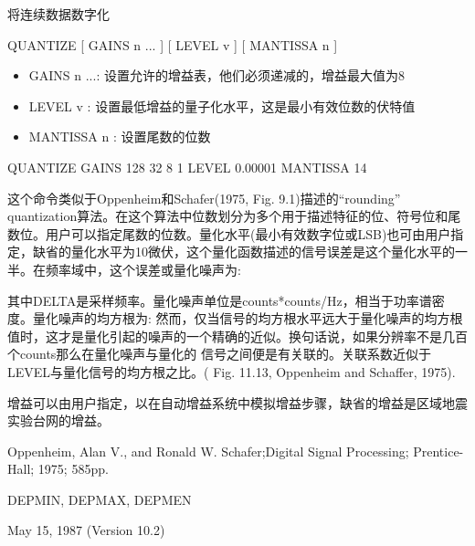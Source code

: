 \label{cmd:quantize}

将连续数据数字化

QUANTIZE [ GAINS n ... ] [ LEVEL v ] [ MANTISSA n ]

\begin{itemize}
\item GAINS n ...: 设置允许的增益表，他们必须递减的，增益最大值为8 
\item LEVEL v :  设置最低增益的量子化水平，这是最小有效位数的伏特值 
\item MANTISSA n : 设置尾数的位数 
\end{itemize}

QUANTIZE GAINS 128 32 8 1 LEVEL 0.00001 MANTISSA 14

这个命令类似于Oppenheim和Schafer(1975, Fig. 9.1)描述的``rounding'' quantization算法。在这个算法中位数划分为多个用于描述特征的位、符号位和尾数位。用户可以指定尾数的位数。量化水平(最小有效数字位或LSB)也可由用户指定，缺省的量化水平为10微伏，这个量化函数描述的信号误差是这个量化水平的一半。在频率域中，这个误差或量化噪声为:

其中DELTA是采样频率。量化噪声单位是counts*counts/Hz，相当于功率谱密度。量化噪声的均方根为:
然而，仅当信号的均方根水平远大于量化噪声的均方根值时，这才是量化引起的噪声的一个精确的近似。换句话说，如果分辨率不是几百个counts那么在量化噪声与量化的	信号之间便是有关联的。关联系数近似于LEVEL与量化信号的均方根之比。( Fig. 11.13, 	Oppenheim and Schaffer, 1975).

增益可以由用户指定，以在自动增益系统中模拟增益步骤，缺省的增益是区域地震实验台网的增益。

Oppenheim, Alan V., and Ronald W. Schafer;Digital Signal Processing; Prentice-Hall; 1975; 585pp.

DEPMIN, DEPMAX, DEPMEN

May 15, 1987 (Version 10.2)
